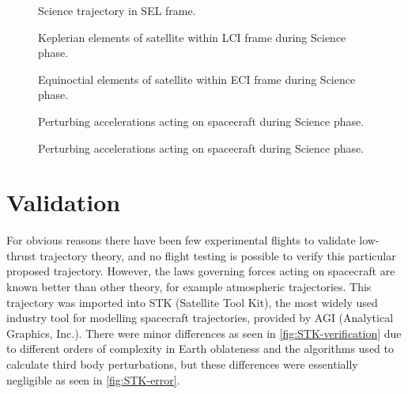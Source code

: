 \begin{figure}
\centering
%
\caption{Science trajectory in SEL frame.}
\label{fig:Science-3D-sel}
\end{figure}

\begin{figure}
\centering
%
\caption{Keplerian elements of satellite within LCI frame during Science phase.}
\label{fig:Science-kep-lci}
\end{figure}

\begin{figure}
\centering
%
\caption{Equinoctial elements of satellite within ECI frame during Science phase.}
\label{fig:Science-mee}
\end{figure}

\begin{figure}
\centering
%
\caption{Perturbing accelerations acting on spacecraft during Science phase.}
\label{fig:Science-pert}
\end{figure}

\begin{figure}
\centering
%
\caption{Perturbing accelerations acting on spacecraft during Science phase.}
\label{fig:Science-pert2}
\end{figure}


\section{Validation}
For obvious reasons there have been few experimental flights to validate low-thrust trajectory theory, and no flight testing is possible to verify this particular proposed trajectory. However, the laws governing forces acting on spacecraft are known better than other theory, for example atmospheric trajectories. This trajectory was imported into STK (Satellite Tool Kit), the most widely used industry tool for modelling spacecraft trajectories, provided by AGI (Analytical Graphics, Inc.). There were minor differences as seen in \ref{fig:STK-verification} due to different orders of complexity in Earth oblateness and the algorithms used to calculate third body perturbations, but these differences were essentially negligible as seen in \ref{fig:STK-error}.

